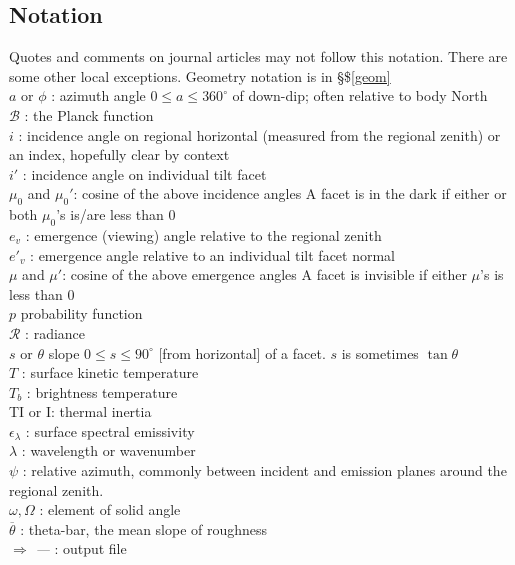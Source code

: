 \documentclass{article}
\newcommand{\qfo}[1]{$\Longrightarrow$ \textit{#1}} %
\begin{document}
\subsection{Notation \label{nota} }
Quotes and comments on journal articles may not follow this notation. There are some other local exceptions.
Geometry notation is in \S \$\ref{geom}
\\ $a$ or $\phi$ : azimuth angle  $0 \leq a \leq 360^\circ $ of down-dip; often relative to body North
\\ $\mathcal{B}$ :  the Planck function
\\ $i$ : incidence angle on regional horizontal (measured from the regional zenith)
\qii  or an index, hopefully clear by context
\\ $i'$ : incidence angle on individual tilt facet
\\ $\mu_0$ and $\mu_0'$: cosine of the above incidence angles
\qi  A facet is in the dark if either or both $\mu_0$'s is/are less than 0
\\ $e_v$ : emergence (viewing) angle relative to the regional zenith
\\ $e'_v$ :  emergence angle relative to an individual tilt facet normal
\\ $\mu$ and $\mu'$: cosine of the above emergence angles
\qi  A facet is invisible if either $\mu$'s is less than 0 
\\ $p$ probability function
\\ $\mathcal{R}$ : radiance
\\ $s$ or $\theta$ slope  $0 \leq s \leq 90^\circ $ [from horizontal] of a facet. $s$ is sometimes $\tan \theta$
\\ $T$ : surface kinetic temperature
\\ $T_b$ : brightness temperature
\\ TI or I: thermal inertia
\\ $\epsilon_\lambda$ : surface spectral emissivity 
\\ $\lambda$ :  wavelength or wavenumber
\\ $\psi$ : relative azimuth, commonly between incident and emission planes around the regional zenith.
\\ $\omega, \Omega$ : element of solid angle
\\ $\overline{\theta}$ : theta-bar, the mean slope of roughness
\\ \qfo{---} : output file
\end{document}
